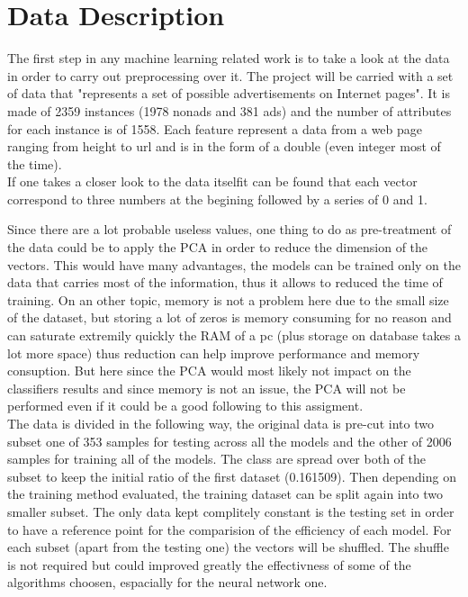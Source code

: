 \section{Data Description}

The first step in any machine learning related work is to take a look at the data in order to carry out preprocessing over it.
The project will be carried with a set of data that "represents a set of possible advertisements on Internet pages". It is made of 2359 instances (1978 nonads and 381 ads) and the number of attributes for each instance is of 1558. Each feature represent a data from a web page ranging from height to url and is in the form of a double (even integer most of the time).\\

If one takes a closer look to the data itselfit can be found that each vector correspond to three numbers at the begining followed by a series of 0 and 1.

Since there are a lot probable useless values, one thing to do as pre-treatment of the data could be to apply the PCA in order to reduce the dimension of the vectors. This would have many advantages, the models can be trained only on the data that carries most of the information, thus it allows to reduced the time of training. On an other topic, memory is not a problem here due to the small size of the dataset, but storing a lot of zeros is memory consuming for no reason and can saturate extremily quickly the RAM of a pc (plus storage on database takes a lot more space) thus reduction can help improve performance and memory consuption. But here since the PCA would most likely not impact on the classifiers results and since memory is not an issue, the PCA will not be performed even if it could be a good following to this assigment.\\

The data is divided in the following way, the original data is pre-cut into two subset one of 353 samples for testing across all the models and the other of 2006 samples for training all of the models. The class are spread over both of the subset to keep the initial ratio of the first dataset (0.161509). Then depending on the training method evaluated, the training dataset can be split again into two smaller subset. The only data kept complitely constant is the testing set in order to have a reference point for the comparision of the efficiency of each model.
For each subset (apart from the testing one) the vectors will be shuffled. The shuffle is not required but could improved greatly the effectivness of some of the algorithms choosen, espacially for the neural network one.
